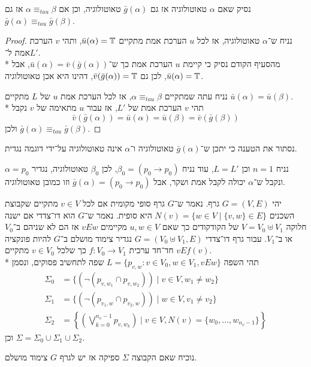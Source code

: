 \Subquestion{}
נסיק שאם $\alpha$ טאוטולוגיה אז גם $\bar{g}(\alpha)$ טאוטולוגיה, וכן אם $\alpha \equiv_{tau} \beta$ אז גם $\bar{g}(\alpha) \equiv_{tau} \bar{g}(\beta)$.
\begin{proof}
	נניח ש־$\alpha$ טאוטולוגיה, אז לכל $u$ הערכת אמת מתקיים $\bar{u}(\alpha) = \mathbb{T}$, ותהי $v$ הערכת אמת ל־$L'$. \\*
	מהסעיף הקודם נסיק כי קיימת $u$ הערכת אמת כך ש־$\bar{u}(\alpha) = \bar{v}(\bar{g}(\alpha))$, אבל $\bar{u}(\alpha) = \mathbb{T}$, לכן גם $\bar{v}(\bar{g}(\alpha)) = \mathbb{T}$, דהינו היא אכן טאוטולוגיה.

	נניח עתה שמתקיים $\alpha \equiv_{tau} \beta$, אז לכל הערכת אמת $u$ של $L$ מתקיים $\bar{u}(\alpha) = \bar{u}(\beta)$. \\*
	תהי $v$ הערכת אמת של $L'$, אז עבור $u$ מתאימה של $v$ נקבל
	\[
		\bar{v}(\bar{g}(\alpha)) = \bar{u}(\alpha) = \bar{u}(\beta) = \bar{v}(\bar{g}(\beta))
	\]
	ולכן $\bar{g}(\alpha) \equiv_{tau} \bar{g}(\beta)$.
\end{proof}

\Subquestion{}
נסתור את הטענה כי יתכן ש־$\bar{g}(\alpha)$ טאוטולוגיה ו־$\alpha$ אינה טאוטולוגיה על־ידי דוגמה נגדית.
\begin{solution}
	נניח $n = 1$ וכן $L = L'$, עוד נניח $\beta_0 = (p_0 \to p_0)$, לכן $\beta_0$ טאוטולוגיה, נגדיר $\alpha = p_0$ ונקבל ש־$\alpha$ יכולה לקבל אמת ושקר, אבל $\bar{g}(\alpha) = (p_0 \to p_0)$ וזו כמובן טאוטולוגיה.
\end{solution}

\Question{}
יהי $G = (V, E)$ גרף. נאמר ש־$G$ גרף סופי מקומית אם לכל $v \in V$ מתקיים שקבוצת השכנים $N(v) = \{ w \in V \mid \{ v, w \} \in E \}$ היא סופית.
נאמר ש־$G$ הוא דו־צדדי אם ישנה חלוקה $V = V_0 \uplus V_1$ של הקודקודים כך שאם $u, w \in V$ מקיימים $vEw$ אז הם לא שניהם ב־$V_0$ או ב־$V_1$.
עבור גרף דו־צדדי $G = (V_0 \uplus V_1, E)$ נגדיר צימוד מושלם ב־$G$ להיות פונקציה חד־חד ערכית $f : V_0 \to V_1$ כך שלכל $v \in V_0$ מתקיים $vEf(v)$. \\*
תהי השפה $L = \{ p_{v, w} : v \in V_0, w \in V_1, vEw \}$ שפה לתחשיב פסוקים, ונסמן
\begin{align*}
	\Sigma_0 & = \{ (\lnot (p_{v, w_1} \cap  p_{v, w_2}) ) \mid v \in V, w_1 \ne w_2 \} \\
	\Sigma_1 & = \{ (\lnot (p_{v_1, w} \cap  p_{v_2, w}) ) \mid w \in V, v_1 \ne v_2 \} \\
	\Sigma_2 & = \left\{ \left( \bigvee_{k = 0}^{n_v - 1} p_{v, w_k} \right) \mid v \in V, N(v) = \{ w_0, \dots, w_{n_v - 1} \} \right\}
\end{align*}
וכן $\Sigma = \Sigma_0 \cup \Sigma_1 \cup \Sigma_2$.

\Subquestion{}
נוכיח שאם הקבוצה $\Sigma$ ספיקה אז יש לגרף $G$ צימוד מושלם.



